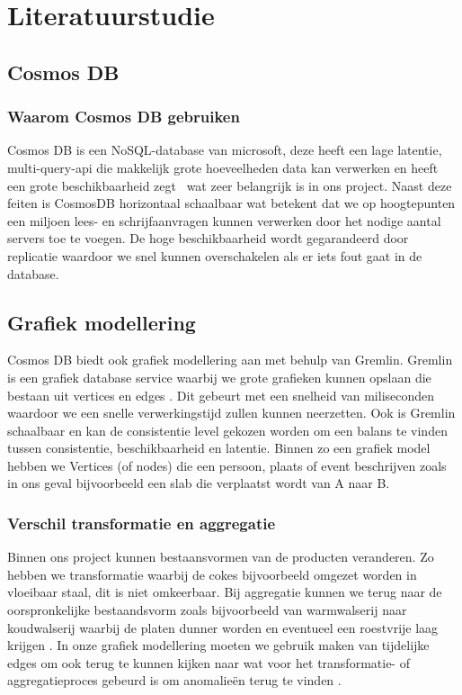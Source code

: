 \section{Literatuurstudie}%
\label{sec:literatuurstudie}

\subsection{Cosmos DB}%
\subsubsection{Waarom Cosmos DB gebruiken}
Cosmos DB is een NoSQL-database van microsoft, deze heeft een lage latentie, multi-query-api die makkelijk grote hoeveelheden data kan verwerken en heeft een grote beschikbaarheid zegt~\textcite{Put2020} wat zeer belangrijk is in ons project.
Naast deze feiten is CosmosDB horizontaal schaalbaar wat betekent dat we op hoogtepunten een miljoen lees- en schrijfaanvragen kunnen verwerken door het nodige aantal servers toe te voegen.
De hoge beschikbaarheid wordt gegarandeerd door replicatie waardoor we snel kunnen overschakelen als er iets fout gaat in de database.

\subsection{Grafiek modellering}
Cosmos DB biedt ook grafiek modellering aan met behulp van Gremlin. Gremlin is een grafiek database service waarbij we grote grafieken kunnen opslaan die bestaan uit vertices en edges \autocite{Microsoft2024}.
Dit gebeurt met een snelheid van miliseconden waardoor we een snelle verwerkingstijd zullen kunnen neerzetten.
Ook is Gremlin schaalbaar en kan de consistentie level gekozen worden om een balans te vinden tussen consistentie, beschikbaarheid en latentie.
Binnen zo een grafiek model hebben we Vertices (of nodes) die een persoon, plaats of event beschrijven zoals in ons geval bijvoorbeeld een slab die verplaatst wordt van A naar B.

\subsubsection{Verschil transformatie en aggregatie}
Binnen ons project kunnen bestaansvormen van de producten veranderen. Zo hebben we transformatie waarbij de cokes bijvoorbeeld omgezet worden in vloeibaar staal, dit is niet omkeerbaar.
Bij aggregatie kunnen we terug naar de oorspronkelijke bestaandsvorm zoals bijvoorbeeld van warmwalserij naar koudwalserij waarbij de platen dunner worden en eventueel een roestvrije laag krijgen \autocite{ArcelorMittal2024}.
In onze grafiek modellering moeten we gebruik maken van tijdelijke edges om ook terug te kunnen kijken naar wat voor het transformatie- of aggregatieproces gebeurd is om anomalieën terug te vinden \autocite{JaewookByun2020}.


